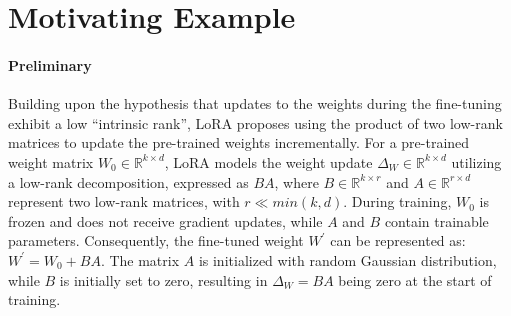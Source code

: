 \documentclass{article} %
\begin{document}
\section{Motivating Example} \label{sec:ana_lora}

\paragraph{Preliminary} 
Building upon the hypothesis that updates to the weights during the fine-tuning exhibit a low ``intrinsic rank'', LoRA \citep{hulora} proposes using the product of two low-rank matrices to update the pre-trained weights incrementally. For a pre-trained weight matrix $W_0 \in \mathbb{R}^{k \times d}$, LoRA models the weight update $\Delta_W \in \mathbb{R}^{k \times d}$ utilizing a low-rank decomposition, expressed as $BA$, where $B \in \mathbb{R}^{k \times r}$ and $A \in \mathbb{R}^{r \times d}$ represent two low-rank matrices, with $r \ll min(k, d)$. During training, $W_0$ is frozen and does not receive gradient updates, while $A$ and $B$ contain trainable parameters. Consequently, the fine-tuned weight $W^{\prime}$ can be represented as: $W^{\prime} = W_0 + BA$. The matrix $A$ is initialized with random Gaussian distribution, while $B$ is initially set to zero, resulting in $\Delta_W = BA$ being zero at the start of training.
\end{document}
